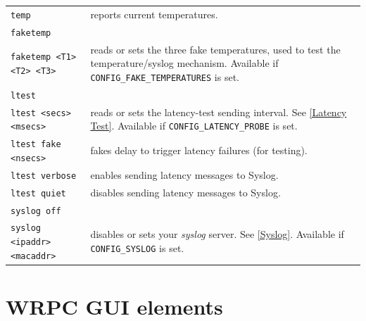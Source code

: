 \documentclass[a4paper, 12pt]{article}
\newcommand{\code}[1]{\texttt{#1}}
\begin{document}
\begin{longtable}{  p{7.5cm}  p{7cm} }
  \code{temp} & reports current temperatures.\\

  \code{faketemp} & \\

  \code{faketemp <T1> <T2> <T3>}  & reads or sets the three fake temperatures, used to test the temperature/syslog mechanism. Available if \texttt{CONFIG\_FAKE\_TEMPERATURES} is set.\\

  \code{ltest} & \\

  \code{ltest <secs> <msecs>} & reads or sets the latency-test sending interval.
See \ref{Latency Test}. Available if \texttt{CONFIG\_LATENCY\_PROBE} is set.\\

  \code{ltest fake <nsecs>} & fakes delay to trigger latency failures (for testing).\\

  \code{ltest verbose} & enables sending latency messages to Syslog.\\

  \code{ltest quiet} & disables sending latency messages to Syslog.\\

  \code{syslog off} & \\

  \code{syslog <ipaddr> <macaddr>} & disables or sets your \textit{syslog} server.
See \ref{Syslog}. Available if \texttt{CONFIG\_SYSLOG} is set.\\

\end{longtable}
\renewcommand\arraystretch{1}



\clearpage
\section{WRPC GUI elements}
\label{WRPC GUI elements}
\end{document}
